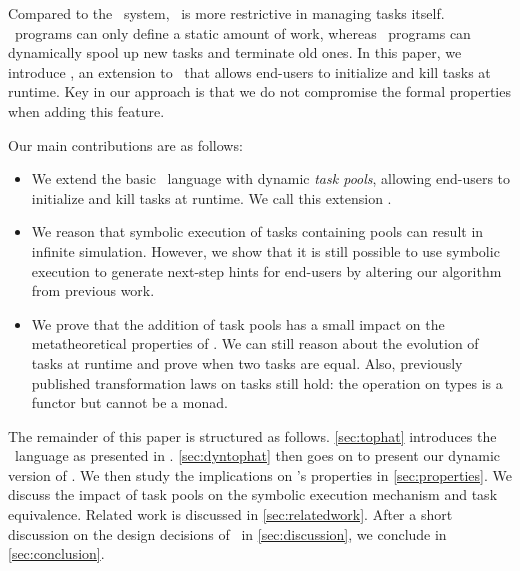 Compared to the \ITASKS\ system, \TOPHAT\ is more restrictive in managing tasks itself.
\TOPHAT\ programs can only define a static amount of work, whereas \ITASKS\ programs can dynamically spool up new tasks and terminate old ones.
In this paper, we introduce \DYNTOPHAT, an extension to \TOPHAT\ that allows end-users to initialize and kill tasks at runtime.
Key in our approach is that we do not compromise the formal properties when adding this feature.


Our main contributions are as follows:
\begin{itemize}
  \item
    We extend the basic \TOPHAT\ language with dynamic \emph{task pools},
    allowing end-users to initialize and kill tasks at runtime.
    We call this extension \DYNTOPHAT.
  \item
    We reason that symbolic execution of tasks containing pools can result in infinite simulation.
    However, we show that it is still possible to use symbolic execution to generate next-step hints for end-users
    by altering our algorithm from previous work.
  \item
    We prove that the addition of task pools has a small impact on the metatheoretical properties of \TOPHAT.
    We can still reason about the evolution of tasks at runtime
    and prove when two tasks are equal.
    Also, previously published transformation laws on tasks still hold:
    the  operation on types is a functor but cannot be a monad.
\end{itemize}



The remainder of this paper is structured as follows.
\cref{sec:tophat} introduces the \TOPHAT\ language as presented in \citet{Steenvoorden22}.
\cref{sec:dyntophat} then goes on to present our dynamic version of \TOPHAT.
We then study the implications on \TOPHAT's properties in \cref{sec:properties}.
We discuss the impact of task pools on the symbolic execution mechanism and task equivalence.
Related work is discussed in \cref{sec:relatedwork}.
After a short discussion on the design decisions of \DYNTOPHAT\ in \cref{sec:discussion},
we conclude in \cref{sec:conclusion}.
